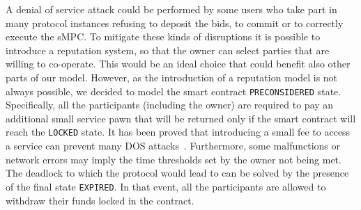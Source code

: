 A denial of service attack could be performed by some users who take part in many \shortname protocol instances refusing to deposit the bids, to commit or to correctly execute the sMPC. 
To mitigate these kinds of disruptions it is possible to introduce a reputation system, so that the owner can select parties that are willing to co-operate. 
This would be an ideal choice that could benefit also other parts of our model. However, as the introduction of a reputation model is not always possible, we decided to model the smart contract \texttt{PRE\textunderscore CONSIDERED} state. 
Specifically, all the participants (including the owner) are required to pay an additional small service pawn that will be returned only if the smart contract will reach the \texttt{LOCKED} state. 
It has been proved that introducing a small fee to access a service can prevent many DOS attacks~\cite{ddos-payments,ddos-survey}. 
Furthermore, some malfunctions or network errors may imply the time thresholds set by the owner not being met.
The deadlock to which the protocol would lead to can be solved by the presence of the final state \texttt{EXPIRED}. 
In that event, all the participants are allowed to withdraw their funds locked in the contract.  